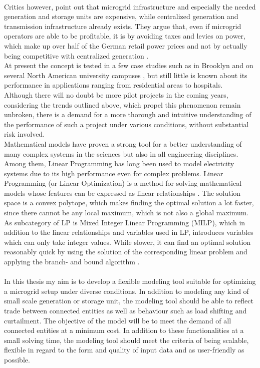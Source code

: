 \documentclass[
	11pt,								%
	DIV10,								%
	a4paper,         					%
	oneside,							%
	headheight=20pt,					%
	footheight=20pt,					%
    parskip=full,						%
    listof=totoc,						%
	bibliography=totoc,					%
	index=totoc,						%
]{scrartcl}
\begin{document}
\\
Critics however, point out that microgrid infrastructure and especially the needed generation and storage units are expensive, while centralized generation and transmission infrastructure already exists. They argue that, even if microgrid operators are able to be profitable, it is by avoiding taxes and levies on power, which make up over half of the German retail power prices \cite{Monitoringbericht20182018} and not by actually being competitive with centralized generation \cite{heindlIstEnergiewendeSozial2014}.
\\
At present the concept is tested in a few case studies such as in Brooklyn \cite{mengelkampDesigningMicrogridEnergy2018} and on several North American university campuses \cite{chenowethRiseUniversityMicrogrids2018}, but still little is known about its performance in applications ranging from residential areas to hospitals.
\\
Although there will no doubt be more pilot projects in the coming years, considering the trends outlined above, which propel this phenomenon remain unbroken, there is a demand for a more thorough and intuitive understanding of the performance of such a project under various conditions, without substantial risk involved.
\\
Mathematical models have proven a strong tool for a better understanding of many complex systems in the sciences but also in all engineering disciplines. Among them, Linear Programming has long been used to model electricity systems due to its high performance even for complex problems. Linear Programming (or Linear Optimization) is a method for solving mathematical models whose features can be expressed as linear relationships \cite{goodarziLinearOptimization2014}. The solution space is a convex polytope, which makes finding the optimal solution a lot faster, since there cannot be any local maximum, which is not also a global maximum. As subcategory of LP is Mixed Integer Linear Programming (MILP), which in addition to the linear relationships and variables used in LP, introduces variables which can only take integer values. While slower, it can find an optimal solution reasonably quick by using the solution of the corresponding linear problem and applying the branch- and bound algorithm \cite{MixedIntegerProgrammingMIP2018}. 
\\\\
In this thesis my aim is to develop a flexible modeling tool suitable for optimizing a microgrid setup under diverse conditions. In addition to modeling any kind of small scale generation or storage unit, the modeling tool should be able to reflect trade between connected entities as well as behaviour such as load shifting and curtailment. The objective of the model will be to meet the demand of all connected entities at a minimum cost. In addition to these functionalities at a small solving time, the modeling tool should meet the criteria of being scalable, flexible in regard to the form and quality of input data and as user-friendly as possible.\\
\end{document}
